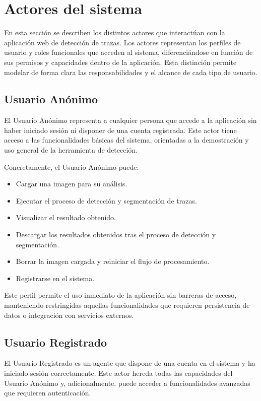 \section{Actores del sistema}

En esta sección se describen los distintos actores que interactúan con la aplicación web de detección de trazas. 
Los actores representan los perfiles de usuario y roles funcionales que acceden al sistema, diferenciándose en función de sus permisos y capacidades dentro de la aplicación. 
Esta distinción permite modelar de forma clara las responsabilidades y el alcance de cada tipo de usuario.

\subsection{Usuario Anónimo}

El Usuario Anónimo representa a cualquier persona que accede a la aplicación sin haber iniciado sesión ni disponer de una cuenta registrada. 
Este actor tiene acceso a las funcionalidades básicas del sistema, orientadas a la demostración y uso general de la herramienta de detección.

Concretamente, el Usuario Anónimo puede:
\begin{itemize}
	\item Cargar una imagen para su análisis.
	\item Ejecutar el proceso de detección y segmentación de trazas.
	\item Visualizar el resultado obtenido.
	\item Descargar los resultados obtenidos tras el proceso de detección y segmentación.
	\item Borrar la imagen cargada y reiniciar el flujo de procesamiento.
	\item Registrarse en el sistema.
\end{itemize}

Este perfil permite el uso inmediato de la aplicación sin barreras de acceso, manteniendo restringidas aquellas funcionalidades que requieren persistencia de datos o integración con servicios externos.

\subsection{Usuario Registrado}

El Usuario Registrado es un agente que dispone de una cuenta en el sistema y ha iniciado sesión correctamente. 
Este actor hereda todas las capacidades del Usuario Anónimo y, adicionalmente, puede acceder a funcionalidades avanzadas que requieren autenticación.

